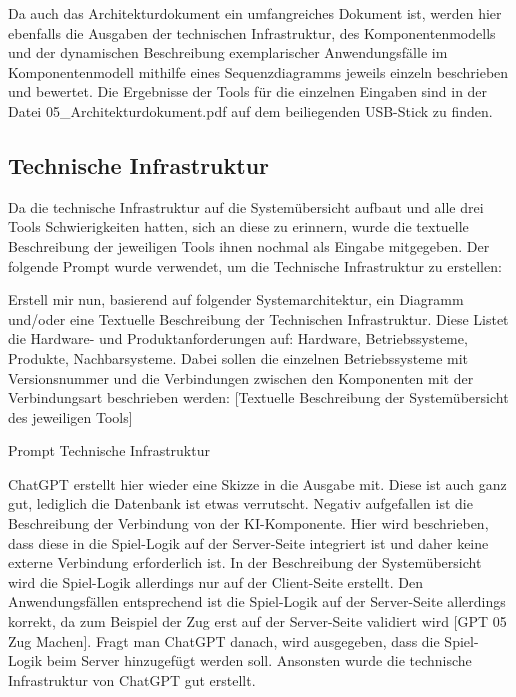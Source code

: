 Da auch das Architekturdokument ein umfangreiches Dokument ist, werden hier ebenfalls die Ausgaben der technischen Infrastruktur, des 
Komponentenmodells und der dynamischen Beschreibung exemplarischer Anwendungsfälle im Komponentenmodell mithilfe eines Sequenzdiagramms 
jeweils einzeln beschrieben und bewertet. Die Ergebnisse der Tools für die einzelnen Eingaben sind in der Datei 05\_Architekturdokument.pdf 
auf dem beiliegenden USB-Stick zu finden.

\subsection*{Technische Infrastruktur}

Da die technische Infrastruktur auf die Systemübersicht aufbaut und alle drei Tools Schwierigkeiten hatten, sich an diese zu erinnern, wurde 
die textuelle Beschreibung der jeweiligen Tools ihnen nochmal als Eingabe mitgegeben. Der folgende Prompt wurde verwendet, um die Technische 
Infrastruktur zu erstellen:

\begin{prompt}[H]
    \begin{tcolorbox}[colback=gray!20, colframe=gray!20, boxrule=0pt, sharp corners] 
        Erstell mir nun, basierend auf folgender Systemarchitektur, ein Diagramm und/oder eine Textuelle Beschreibung der Technischen Infrastruktur. 
        Diese Listet die Hardware- und Produktanforderungen auf: Hardware, Betriebssysteme, Produkte, Nachbarsysteme. Dabei sollen die einzelnen 
        Betriebssysteme mit Versionsnummer und die Verbindungen zwischen den Komponenten mit der Verbindungsart beschrieben werden: [Textuelle 
        Beschreibung der Systemübersicht des jeweiligen Tools]
        \vfill
    \end{tcolorbox}
    \caption{Prompt Technische Infrastruktur}
    \label{Prompt Technische Infrastruktur}
\end{prompt}

ChatGPT erstellt hier wieder eine Skizze in die Ausgabe mit. Diese ist auch ganz gut, lediglich die Datenbank ist etwas verrutscht. Negativ aufgefallen 
ist die Beschreibung der Verbindung von der KI-Komponente. Hier wird beschrieben, dass diese in die Spiel-Logik auf der Server-Seite integriert ist und 
daher keine externe Verbindung erforderlich ist. In der Beschreibung der Systemübersicht wird die Spiel-Logik allerdings nur auf der Client-Seite erstellt. 
Den Anwendungsfällen entsprechend ist die Spiel-Logik auf der Server-Seite allerdings korrekt, da zum Beispiel der Zug erst auf der Server-Seite validiert 
wird [GPT 05 Zug Machen]. Fragt man ChatGPT danach, wird ausgegeben, dass die Spiel-Logik beim Server hinzugefügt werden soll. Ansonsten wurde die 
technische Infrastruktur von ChatGPT gut erstellt.

